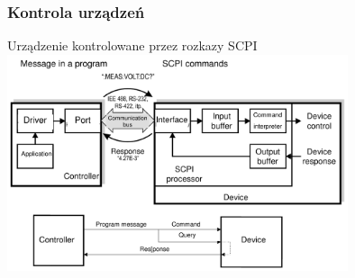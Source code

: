 \subsubsection{Kontrola urządzeń}
Urządzenie kontrolowane przez rozkazy SCPI\\
\includegraphics[width=10cm]{./wyklady/IEEE488_SCPI_16_1.pdf}

\newpage
